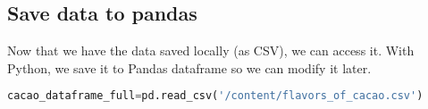 \subsection{Save data to pandas}
Now that we have the data saved locally (as CSV), we can access it. With Python, we save it to Pandas dataframe so we can modify it later.
\begin{lstlisting}[language=Python, caption=Save data to pandas]
cacao_dataframe_full=pd.read_csv('/content/flavors_of_cacao.csv')
\end{lstlisting}